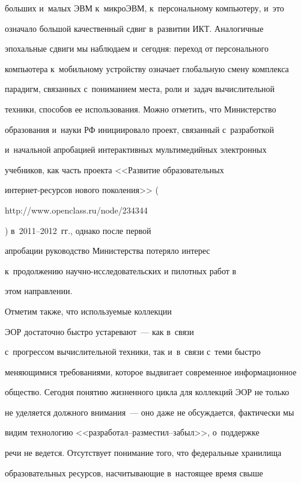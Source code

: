 больших и~малых ЭВМ к~микроЭВМ, к~персональному компьютеру, и~это


означало большой качественный сдвиг в~развитии ИКТ. Аналогичные


эпохальные сдвиги мы наблюдаем и~сегодня: переход от персонального


компьютера к~мобильному устройству означает глобальную смену комплекса


парадигм, связанных с~пониманием места, роли и~задач вычислительной


техники, способов ее использования. Можно отметить, что Министерство


образования и~науки РФ инициировало проект, связанный с~разработкой


и~начальной апробацией интерактивных мультимедийных электронных


учебников, как часть проекта <<Развитие образовательных


     ин\-тер\-нет-ре\-сур\-сов нового поколения>> ({\sf


http://www.openclass.ru/node/234344}) в~2011--2012~гг., однако после первой


апробации руководство Министерства потеряло интерес


     к~продолжению на\-уч\-но-ис\-сле\-до\-ва\-тель\-ских и пилотных работ в


этом направлении.


{





}





     Отметим также, что используемые коллекции


ЭОР достаточно быстро устаревают~--- как в~связи


с~прогрессом вычислительной техники, так и~в~связи с~теми быст\-ро


меняющимися требованиями, которое выдвигает современное информационное


общество. Сегодня понятию жизненного цикла для коллекций ЭОР не только


не уделяется должного внимания~--- оно даже не обсуждается, фактически мы


видим технологию <<раз\-ра\-бо\-тал--раз\-мес\-тил--за\-был>>, о~поддержке


речи не ведется. Отсутствует понимание того, что федеральные хранилища


образовательных ресурсов, насчитывающие в~настоящее время свыше


